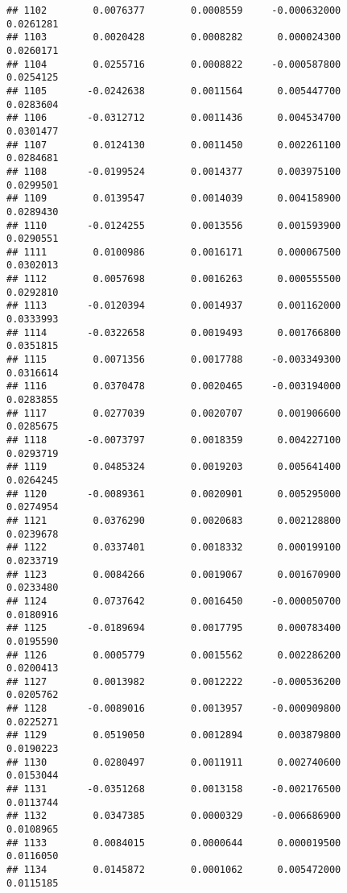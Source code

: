 \documentclass[
]{article}
\begin{document}
\begin{verbatim}
## 1102        0.0076377        0.0008559     -0.000632000             0.0261281
## 1103        0.0020428        0.0008282      0.000024300             0.0260171
## 1104        0.0255716        0.0008822     -0.000587800             0.0254125
## 1105       -0.0242638        0.0011564      0.005447700             0.0283604
## 1106       -0.0312712        0.0011436      0.004534700             0.0301477
## 1107        0.0124130        0.0011450      0.002261100             0.0284681
## 1108       -0.0199524        0.0014377      0.003975100             0.0299501
## 1109        0.0139547        0.0014039      0.004158900             0.0289430
## 1110       -0.0124255        0.0013556      0.001593900             0.0290551
## 1111        0.0100986        0.0016171      0.000067500             0.0302013
## 1112        0.0057698        0.0016263      0.000555500             0.0292810
## 1113       -0.0120394        0.0014937      0.001162000             0.0333993
## 1114       -0.0322658        0.0019493      0.001766800             0.0351815
## 1115        0.0071356        0.0017788     -0.003349300             0.0316614
## 1116        0.0370478        0.0020465     -0.003194000             0.0283855
## 1117        0.0277039        0.0020707      0.001906600             0.0285675
## 1118       -0.0073797        0.0018359      0.004227100             0.0293719
## 1119        0.0485324        0.0019203      0.005641400             0.0264245
## 1120       -0.0089361        0.0020901      0.005295000             0.0274954
## 1121        0.0376290        0.0020683      0.002128800             0.0239678
## 1122        0.0337401        0.0018332      0.000199100             0.0233719
## 1123        0.0084266        0.0019067      0.001670900             0.0233480
## 1124        0.0737642        0.0016450     -0.000050700             0.0180916
## 1125       -0.0189694        0.0017795      0.000783400             0.0195590
## 1126        0.0005779        0.0015562      0.002286200             0.0200413
## 1127        0.0013982        0.0012222     -0.000536200             0.0205762
## 1128       -0.0089016        0.0013957     -0.000909800             0.0225271
## 1129        0.0519050        0.0012894      0.003879800             0.0190223
## 1130        0.0280497        0.0011911      0.002740600             0.0153044
## 1131       -0.0351268        0.0013158     -0.002176500             0.0113744
## 1132        0.0347385        0.0000329     -0.006686900             0.0108965
## 1133        0.0084015        0.0000644      0.000019500             0.0116050
## 1134        0.0145872        0.0001062      0.005472000             0.0115185

\end{verbatim}
\end{document}

